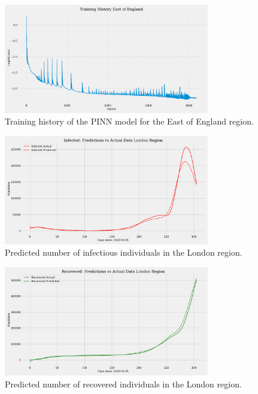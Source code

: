 \documentclass[12pt, letterpaper]{report}
\begin{document}
\begin{figure}[ht]
    \centering
    \includegraphics[width=0.8\textwidth]{images/pinn/Training_History_East of England.pdf}
    \caption{Training history of the PINN model for the East of England region.}
    \label{fig:Training_History_East_of_England}
\end{figure}

\begin{figure}[ht]
    \centering
    \includegraphics[width=0.8\textwidth]{images/pinn/I_predictions_London Region.pdf}
    \caption{Predicted number of infectious individuals in the London region.}
    \label{fig:I_predictions_London}
\end{figure}

\begin{figure}[ht]
    \centering
    \includegraphics[width=0.8\textwidth]{images/pinn/R_predictions_London Region.pdf}
    \caption{Predicted number of recovered individuals in the London region.}
    \label{fig:R_predictions_London}
\end{figure}
\end{document}
